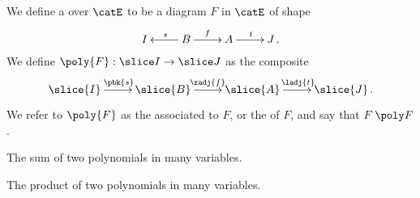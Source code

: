 \begin{def}
  We define a  over $\catE$ to be a diagram $F$ in $\catE$ of shape
  \begin{equation}
  \lean{MvPoly}
  \label{equ:poly}
  \xymatrix{
  I  & B \ar[l]_s \ar[r]^f & A \ar[r]^t & J \, . }
  \end{equation}
  We define $\poly{F}:\slice I \to \slice J$ as the composite
  \[
  \xymatrix{
  \slice{I} \ar[r]^{\pbk{s}} & \slice{B} \ar[r]^{\radj{f}} & \slice{A} \ar[r]^{\ladj{t}} & \slice{J} \, . }
  \]
  We refer to $\poly{F}$ as the  associated to $F$, or
  the  of $F$, and say that $F$  $\poly F$.
\end{def}

\begin{def}
The sum of two polynomials in many variables.
\end{def}

\begin{def}
The product of two polynomials in many variables.
\end{def}

